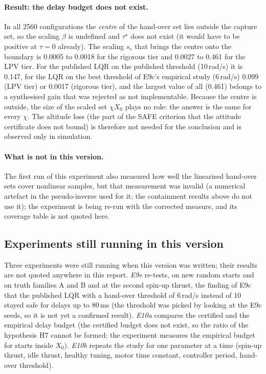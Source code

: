 \paragraph{Result: the delay budget does not exist.} In all 2560 configurations the \emph{centre} of the hand-over set lies outside the capture set, so the scaling $\beta$ is undefined and $\tau^\star$ does not exist (it would have to be positive at $\tau=0$ already). The scaling $s_c$ that brings the centre onto the boundary is 0.0005 to 0.0018 for the rigorous tier and 0.0027 to 0.461 for the LPV tier. For the published LQR on the published threshold (10\,rad/s) it is 0.147, for the LQR on the best threshold of E9c's empirical study (6\,rad/s) 0.099 (LPV tier) or 0.0017 (rigorous tier), and the largest value of all (0.461) belongs to a synthesised gain that was rejected as not implementable. Because the centre is outside, the size of the scaled set $\chi X_0$ plays no role: the answer is the same for every $\chi$. The altitude loss (the part of the SAFE criterion that the attitude certificate does not bound) is therefore not needed for the conclusion and is observed only in simulation.

\paragraph{What is not in this version.} The first run of this experiment also measured how well the linearised hand-over sets cover nonlinear samples, but that measurement was invalid (a numerical artefact in the pseudo-inverse used for it; the containment results above do not use it); the experiment is being re-run with the corrected measure, and its coverage table is not quoted here.

\subsection{Experiments still running in this version}\label{sec:pending}
Three experiments were still running when this version was written; their results are not quoted anywhere in this report. \emph{E9e} re-tests, on new random starts and on truth families A and B and at the second spin-up thrust, the finding of E9c that the published LQR with a hand-over threshold of 6\,rad/s instead of 10 stayed safe for delays up to 80\,ms (the threshold was picked by looking at the E9c seeds, so it is not yet a confirmed result). \emph{E10a} compares the certified and the empirical delay budget (the certified budget does not exist, so the ratio of the hypothesis H7 cannot be formed; the experiment measures the empirical budget for starts inside $X_0$). \emph{E10b} repeats the study for one parameter at a time (spin-up thrust, idle thrust, healthy tuning, motor time constant, controller period, hand-over threshold).

